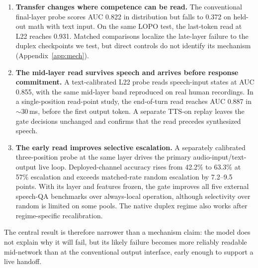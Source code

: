 \begin{enumerate}
\item \textbf{Transfer changes where competence can be read.}
  The conventional final-layer probe scores AUC 0.822 in distribution
  but falls to 0.372 on held-out math with text input. On the same LOPO
  test, the last-token read at L22 reaches 0.931. Matched comparisons
  localize the late-layer failure to the duplex checkpoints we test,
  but direct controls do not identify its mechanism
  (Appendix~\ref{app:mech}).
\item \textbf{The mid-layer read survives speech and arrives before
  response commitment.} A text-calibrated L22 probe reads speech-input
  states at AUC 0.855, with the same mid-layer band reproduced on real
  human recordings. In a single-position read-point study, the
  end-of-turn read reaches AUC 0.887 in $\sim$30\,ms, before the first
  output token. A separate TTS-on replay leaves the gate decisions
  unchanged and confirms that the read precedes synthesized speech.
\item \textbf{The early read improves selective escalation.}
  A separately calibrated three-position probe at the same layer drives
  the primary audio-input/text-output live loop. Deployed-channel
  accuracy rises from 42.2\% to 63.3\% at 57\% escalation and exceeds
  matched-rate random escalation by 7.2--9.5 points. With its layer and
  features frozen, the gate improves all five external speech-QA
  benchmarks over always-local operation, although selectivity over
  random is limited on some pools. The native duplex regime also works
  after regime-specific recalibration.
\end{enumerate}

The central result is therefore narrower than a mechanism claim: the
model does not explain why it will fail, but its likely failure becomes
more reliably readable mid-network than at the conventional output
interface, early enough to support a live handoff.

